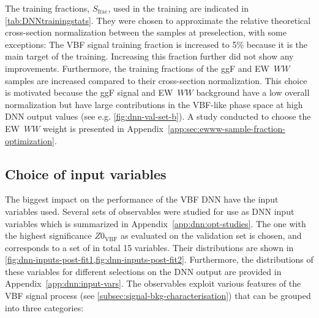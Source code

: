 The training fractions, $S_\text{frac}$, used in the training are indicated in \cref{tab:DNNtrainingstats}. They were chosen to approximate the relative theoretical cross-section normalization between the samples at preselection, with some exceptions: The VBF signal training fraction is increased to 5\% because it is the main target of the training. Increasing this fraction further did not show any improvements. Furthermore, the training fractions of the ggF and EW~$WW$ samples are increased compared to their cross-section normalization. 
This choice is motivated because the ggF signal and EW~$WW$ background have a low overall normalization but have large contributions in the VBF-like phase space at high DNN output values (see e.g. \cref{fig:dnn-val-set-b}). 
A study conducted to choose the EW~$WW$ weight is presented in Appendix~\ref{app:sec:ewww-sample-fraction-optimization}.

\subsection{Choice of input variables}
\label{subsec:input-variables-opt}
The biggest impact on the performance of the VBF DNN have the input variables used.
Several sets of observables were studied for use as DNN input variables which is summarized in Appendix~\ref{app:dnn:opt-studies}.
The one with the highest significance $Z0_\mathrm{VBF}$ as evaluated on the validation set is chosen, and corresponds to a set of in total 15 variables.
Their distributions are shown in \cref{fig:dnn-inputs-post-fit1,fig:dnn-inputs-post-fit2}.
Furthermore, the distributions of these variables for different selections on the DNN output are provided in Appendix~\ref{app:dnn:input-vars}. 
The observables exploit various features of the VBF signal process (see \cref{subsec:signal-bkg-characterisation}) that can be grouped into three categories:

